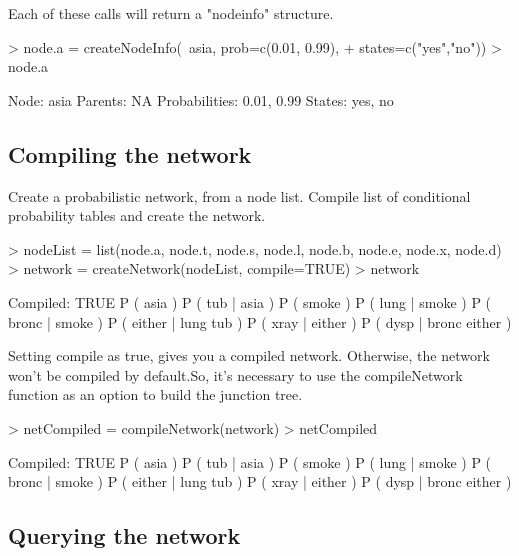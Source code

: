 \documentclass[a4paper]{article}
\begin{document}
Each of these calls will return a "nodeinfo" structure.

\begin{Schunk}
\begin{Sinput}
> node.a = createNodeInfo(~asia, prob=c(0.01, 0.99), 
+                         states=c("yes","no"))
> node.a
\end{Sinput}
\begin{Soutput}
Node:           asia
Parents:        NA
Probabilities:  0.01, 0.99
States:         yes, no
\end{Soutput}
\end{Schunk}

\subsection{Compiling the network}

Create a probabilistic network, from a node list.
Compile list of conditional probability tables and create the network.

\begin{Schunk}
\begin{Sinput}
> nodeList = list(node.a, node.t, node.s, node.l, node.b, node.e, node.x, node.d)
> network = createNetwork(nodeList, compile=TRUE)
> network
\end{Sinput}
\begin{Soutput}
Compiled: TRUE
P ( asia )
P ( tub | asia )
P ( smoke )
P ( lung | smoke )
P ( bronc | smoke )
P ( either | lung tub )
P ( xray | either )
P ( dysp | bronc either )
\end{Soutput}
\end{Schunk}

Setting compile as true, gives you a compiled network. Otherwise, the network won't
be compiled by default.So, it's necessary to use the compileNetwork function as an
option to build the junction tree.

\begin{Schunk}
\begin{Sinput}
> netCompiled = compileNetwork(network)
> netCompiled
\end{Sinput}
\begin{Soutput}
Compiled: TRUE
P ( asia )
P ( tub | asia )
P ( smoke )
P ( lung | smoke )
P ( bronc | smoke )
P ( either | lung tub )
P ( xray | either )
P ( dysp | bronc either )
\end{Soutput}
\end{Schunk}

\subsection{Querying the network}
\end{document}
